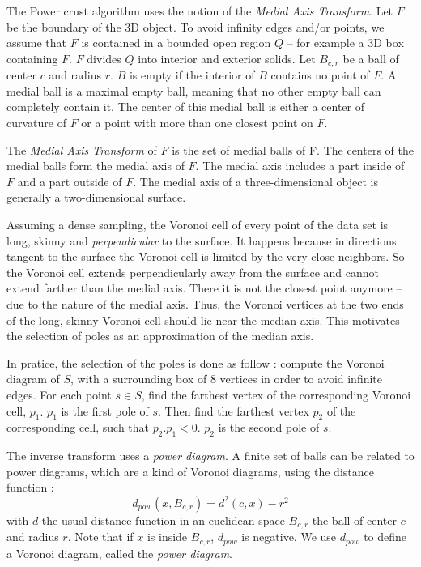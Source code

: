 \documentclass[a4paper]{article}
\begin{document}
The Power crust algorithm uses the notion of the \textit{Medial Axis Transform}. Let $F$ be the boundary of the 3D object. To avoid infinity edges and/or points, we assume that $F$ is contained in a bounded open region $Q$ -- for example a 3D box containing $F$. $F$ divides $Q$ into interior and exterior solids. Let $B_{c,r}$ be a ball of center $c$ and radius $r$. $B$ is empty if the interior of $B$ contains no point of $F$. A medial ball is a maximal empty ball, meaning that no other empty ball can completely contain it. The center of this medial ball is either a center of curvature of $F$ or a point with more than one closest point on $F$.

The \textit{Medial Axis Transform} of $F$ is the set of medial balls of F. The centers of the medial balls form the medial axis of $F$. The medial axis includes a part inside of $F$ and a part outside of $F$. The medial axis of a three-dimensional object is generally a two-dimensional surface.

Assuming a dense sampling, the Voronoi cell of every point of the data set is long, skinny and \textit{perpendicular} to the surface. It happens because in directions tangent to the surface the Voronoi cell is limited by the very close neighbors. So the Voronoi cell extends perpendicularly away from the surface and cannot extend farther than the medial axis. There it is not the closest point anymore -- due to the nature of the medial axis. Thus, the Voronoi vertices at the two ends of the long, skinny Voronoi cell should lie near the median axis. This motivates the selection of poles as an approximation of the median axis.


In pratice, the selection of the poles is done as follow : compute the Voronoi diagram of $S$, with a surrounding box of 8 vertices in order to avoid infinite edges. For each point $s \in S$, find the farthest vertex of the corresponding Voronoi cell, $p_1$. $p_1$ is the first pole of $s$. Then find the farthest vertex $p_2$ of the corresponding cell, such that $p_2.p_1 < 0$. $p_2$ is the second pole of $s$.

The inverse transform uses a \textit{power diagram}. A finite set of balls can be related to power diagrams, which are a kind of Voronoi diagrams, using the distance function :
$$d_{pow}(x, B_{c,r}) = d^2(c,x) - r^2$$
with $d$ the usual distance function in an euclidean space  $B_{c,r}$ the ball of center $c$ and radius $r$. Note that if $x$ is inside $B_{c,r}$, $d_{pow}$ is negative. We use $d_{pow}$ to define a Voronoi diagram, called the \textit{power diagram}.
\end{document}
